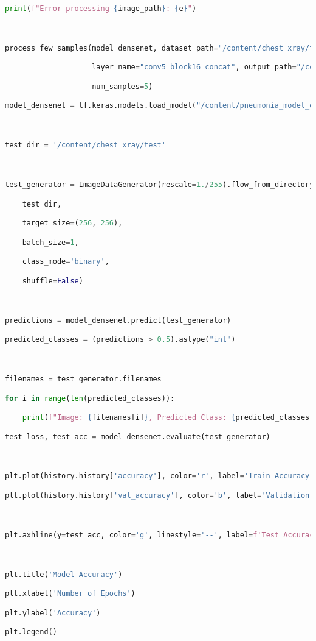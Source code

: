 \documentclass{article}
\begin{document}
\begin{lstlisting}[style=mystyle,language=Python]
                print(f"Error processing {image_path}: {e}")



process_few_samples(model_densenet, dataset_path="/content/chest_xray/train",

                    layer_name="conv5_block16_concat", output_path="/content/chest_xray_gradcam_densenet",

                    num_samples=5)

model_densenet = tf.keras.models.load_model("/content/pneumonia_model_densenet.h5")



test_dir = '/content/chest_xray/test'



test_generator = ImageDataGenerator(rescale=1./255).flow_from_directory(

    test_dir,

    target_size=(256, 256),

    batch_size=1,

    class_mode='binary',

    shuffle=False)



predictions = model_densenet.predict(test_generator)

predicted_classes = (predictions > 0.5).astype("int")



filenames = test_generator.filenames

for i in range(len(predicted_classes)):

    print(f"Image: {filenames[i]}, Predicted Class: {predicted_classes[i]}")

test_loss, test_acc = model_densenet.evaluate(test_generator)



plt.plot(history.history['accuracy'], color='r', label='Train Accuracy')

plt.plot(history.history['val_accuracy'], color='b', label='Validation Accuracy')



plt.axhline(y=test_acc, color='g', linestyle='--', label=f'Test Accuracy: {test_acc:.2f}')



plt.title('Model Accuracy')

plt.xlabel('Number of Epochs')

plt.ylabel('Accuracy')

plt.legend()


\end{lstlisting}
\end{document}
